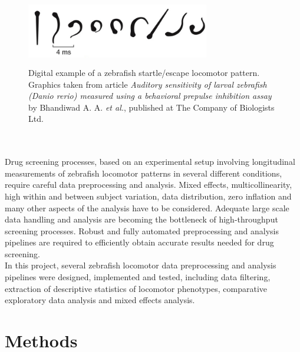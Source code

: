 \documentclass[a4paper,12pt]{article}
\begin{document}
\begin{figure}[h]
\begin{center}
\includegraphics[width=8cm,height=3cm]{ZEBRAFISH_C_ESCAPE.jpg}
\caption{Digital example of a zebrafish startle/escape locomotor pattern. Graphics taken from article \textit{Auditory sensitivity of larval zebrafish (Danio rerio) measured using a behavioral prepulse inhibition assay} by Bhandiwad A. A. \textit{et al.}, published at  The Company of Biologists Ltd\cite{ref24}. }
\end{center}
\end{figure}\\\\
Drug screening processes, based on an experimental setup involving longitudinal measurements of zebrafish locomotor patterns in several different conditions, require careful data preprocessing and analysis\cite{ref22}\cite{ref23}. Mixed effects, multicollinearity, high within and between subject variation, data distribution, zero inflation and many other aspects of the analysis have to be considered. Adequate large scale data handling and analysis are becoming the bottleneck of high-throughput screening processes. Robust and fully automated preprocessing and analysis pipelines are required to efficiently obtain accurate results needed for drug screening.
\\In this project, several zebrafish locomotor data preprocessing and analysis pipelines were designed, implemented and tested, including data filtering, extraction of descriptive statistics of locomotor phenotypes, comparative exploratory data analysis and mixed effects analysis.
\section{Methods}
\end{document}

